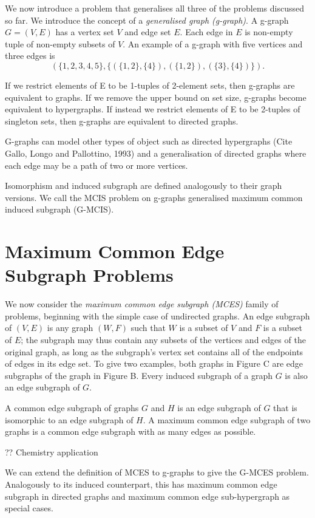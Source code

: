 We now introduce a problem that generalises all three of the problems discussed
so far. We introduce the concept of a \emph{generalised graph (g-graph)}. A
g-graph $G = (V, E)$ has a vertex set $V$ and edge set $E$. Each edge in $E$ is
non-empty tuple of non-empty subsets of $V$. An example of a g-graph with five
vertices and three edges is
\[
(\{1,2,3,4,5\}, \{(\{1,2\},\{4\}), (\{1,2\}), (\{3\},\{4\})\}).
\]

If we restrict elements of E to be 1-tuples of 2-element sets, then g-graphs
are equivalent to graphs. If we remove the upper bound on set size, g-graphs
become equivalent to hypergraphs. If instead we restrict elements of E to be
2-tuples of singleton sets, then g-graphs are equivalent to directed graphs.

G-graphs can model other types of object such as directed hypergraphs (Cite
Gallo, Longo and Pallottino, 1993) and a generalisation of directed graphs
where each edge may be a path of two or more vertices.

Isomorphism and induced subgraph are defined analogously to their graph
versions. We call the MCIS problem on g-graphs generalised maximum common
induced subgraph (G-MCIS).

\section{Maximum Common Edge Subgraph Problems}

We now consider the \emph{maximum common edge subgraph (MCES)} family of problems,
beginning with the simple case of undirected graphs. An edge subgraph of $(V, E)$
is any graph $(W, F)$ such that $W$ is a subset of $V$ and $F$ is a subset of $E$; the
subgraph may thus contain any subsets of the vertices and edges of the original
graph, as long as the subgraph’s vertex set contains all of the endpoints of
edges in its edge set. To give two examples, both graphs in Figure C are edge
subgraphs of the graph in Figure B. Every induced subgraph of a graph $G$ is also
an edge subgraph of $G$.

A common edge subgraph of graphs $G$ and $H$ is an edge subgraph of $G$ that is
isomorphic to an edge subgraph of $H$. A maximum common edge subgraph of two
graphs is a common edge subgraph with as many edges as possible.

?? Chemistry application

We can extend the definition of MCES to g-graphs to give the G-MCES problem.
Analogously to its induced counterpart, this has maximum common edge subgraph
in directed graphs and maximum common edge sub-hypergraph as special cases.

